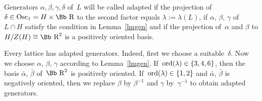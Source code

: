 \documentclass[pdftex]{sigma}
\newcommand\RR{{\mbox{\Bb R}}}
\newcommand{\Osc}{{\rm Osc}}
\newcommand{\ord}{{\rm ord}}
\numberwithin{equation}{section}
\begin{document}
\begin{Definition}\label{def:adapted}
Generators $\alpha,\beta,\gamma,\delta$ of~$L$ will be called adapted if
the projection of~$\delta\in \Osc_1=H\times \RR$ to the second factor equals $\lambda:=\lambda(L)$,
if $\alpha$, $\beta$, $\gamma$ of~$L\cap H$ satisfy the condition in Lemma~\ref{lmgen} and
if the projection of~$\alpha$ and $\beta$ to $H/Z(H)\cong\RR^2$ is a positively oriented basis.
\end{Definition}

Every lattice has adapted generators. Indeed, first we choose a suitable~$\delta$. Now we choose $\alpha$, $\beta$, $\gamma$ according to Lemma~\ref{lmgen}. If~$\ord(\lambda)\in\{3,4,6\}$, then the basis $\bar \alpha$, $\bar\beta$ of~$\RR^2$ is positively oriented. If~$\ord(\lambda)\in\{1,2\}$ and $\bar \alpha$, $\bar \beta$ is negatively oriented, then we replace $\beta$ by $\beta^{-1}$ and $\gamma$ by~$\gamma^{-1}$ to obtain adapted generators.
\end{document}
